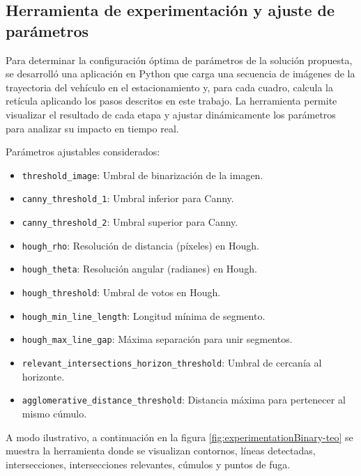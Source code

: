 \subsection{Herramienta de experimentación y ajuste de parámetros}\label{sec:experimentation-tool}

Para determinar la configuración óptima de parámetros de la solución propuesta, se desarrolló una aplicación en Python
que carga una secuencia de imágenes de la trayectoria del vehículo en el estacionamiento y, para cada cuadro,
calcula la retícula aplicando los pasos descritos en este trabajo. La herramienta permite visualizar el resultado de cada
etapa y ajustar dinámicamente los parámetros para analizar su impacto en tiempo real.


Parámetros ajustables considerados:
\begin{itemize}
	\item \texttt{threshold\_image}: Umbral de binarización de la imagen.
	\item \texttt{canny\_threshold\_1}: Umbral inferior para Canny.
	\item \texttt{canny\_threshold\_2}: Umbral superior para Canny.
	\item \texttt{hough\_rho}: Resolución de distancia (píxeles) en Hough.
	\item \texttt{hough\_theta}: Resolución angular (radianes) en Hough.
	\item \texttt{hough\_threshold}: Umbral de votos en Hough.
	\item \texttt{hough\_min\_line\_length}: Longitud mínima de segmento.
	\item \texttt{hough\_max\_line\_gap}: Máxima separación para unir segmentos.
	\item \texttt{relevant\_intersections\_horizon\_threshold}: Umbral de cercanía al horizonte.
	\item \texttt{agglomerative\_distance\_threshold}: Distancia máxima para pertenecer al mismo cúmulo.
\end{itemize}


A modo ilustrativo, a continuación  en la figura \ref{fig:experimentationBinary-teo} 
se muestra la herramienta donde se visualizan contornos, líneas detectadas,
intersecciones, intersecciones relevantes, cúmulos y puntos de fuga.

